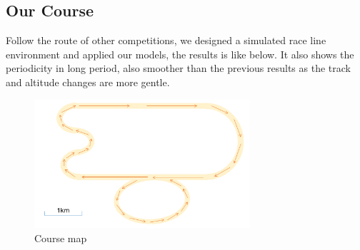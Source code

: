 \documentclass{mcmthesis}
\begin{document}
\subsection{Our Course}
Follow the route of other competitions, we designed a simulated race line environment and applied our models, the results is like below. It also shows the periodicity in long period, also smoother than the previous results as the track and altitude changes are more gentle.
\begin{figure}[H]
\small
\centering
\includegraphics[width=8cm]{mcmthesis/figures/our course.png}
\caption{Course map} 
\end{figure}
\end{document}
